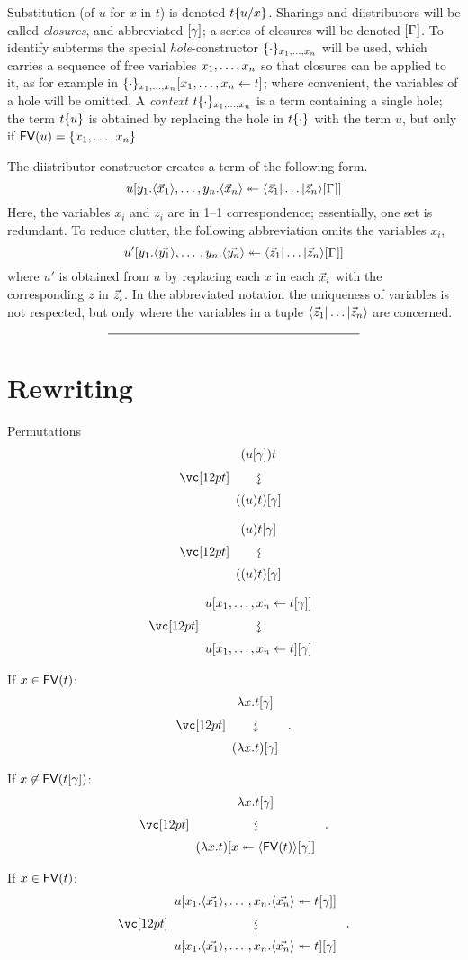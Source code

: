 \documentclass{amsart}
\begin{document}
Substitution (of $u$ for $x$ in $t$) is denoted $t\sub xu$.
%
Sharings and diistributors will be called \emph{closures}, and abbreviated $\g$; a series of closures will be denoted $\G$.
%
To identify subterms the special \emph{hole}-constructor $\cxt[\vv x]$ will be used, which carries a sequence of free variables $\vv x$ so that closures can be applied to it, as for example in $\cxt[\vv x]\share xt$; where convenient, the variables of a hole will be omitted.
%
A \emph{context} $t\cxt[\vv x]$ is a term containing a single hole; the term $t\cxt*u$ is obtained by replacing the hole in $t\cxt$ with the term $u$, but only if $\FV(u)=\{\vv x\}$



The diistributor constructor creates a term of the following form.
\[
	u\diistr*{y_1.\tup*{\vv*x_1},\ldots,y_n.\tup*{\vv*x_n}}y{\ttup*z\G}
\]
Here, the variables $x_i$ and $z_i$ are in 1--1 correspondence; essentially, one set is redundant.
%
To reduce clutter, the following abbreviation omits the variables $x_i$,
\[
	u'\diistr yy{\ttup*z\G}
\]
where $u'$ is obtained from $u$ by replacing each $x$ in each $\vv*x_i$ with the corresponding $z$ in $\vv*z_i$.
%
In the abbreviated notation the uniqueness of variables is not respected, but only where the variables in a tuple $\ttup*z$ are concerned.


\[
	\rule{200pt}{.5pt}
\]


\section*{Rewriting}

\noindent
Permutations
\[
\displayrewrite
{ (u\g)t }
{ ((u)t)\g }
\]

\bigskip

\[
\displayrewrite
{ (u)t\g }
{ ((u)t)\g }
\]

\[
\displayrewrite
{ u\share x{t\g} }
{ u\share xt\g }
\]

\noindent
If $x\in\FV(t)$:
\[
\displayrewrite
{ \lambda x. t\g }
{ (\lambda x. t) \g }\;.
\]

\noindent
If $x\not\in\FV(t\g)$:
\[
\displayrewrite
{ \lambda x. t\g }
{ (\lambda x. t) \diistr* xx{\tup*{\FV(t)}\g} }\;.
\]

\noindent
If $x\in\FV(t)$:
\[
\displayrewrite
  { u\diistr xx{t\g} }
  { u\diistr xxt \g }\;.
\]
\end{document}
